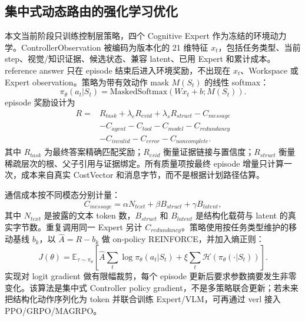 \documentclass[10pt,a4paper,twocolumn]{ctexart}
\begin{document}
\subsection{集中式动态路由的强化学习优化}
本文当前阶段只训练控制层策略，四个 Cognitive Expert 作为冻结的环境动力学。ControllerObservation 被编码为版本化的 21 维特征 $x_t$，包括任务类型、当前 step、视觉/知识证据、候选状态、兼容 latent、已用 Expert 和累计成本。reference answer 只在 episode 结束后进入环境奖励，不出现在 $x_t$、Workspace 或 Expert observation。策略为带有效动作 mask $M(S_t)$ 的线性 softmax：
\begin{equation}
\pi_\theta(a_t|S_t)=\mathrm{MaskedSoftmax}(Wx_t+b;M(S_t)).
\end{equation}
episode 奖励设计为
\begin{equation}
\begin{aligned}
R={}&R_{task}+\lambda_eR_{evid}+\lambda_sR_{struct}-C_{message}\\
&-C_{agent}-C_{tool}-C_{model}-C_{redundancy}\\
&-C_{invalid}-C_{error}-C_{noncomplete}.
\end{aligned}
\label{eq:reward}
\end{equation}
其中 $R_{task}$ 为最终答案精确匹配奖励；$R_{evid}$ 衡量证据链接与置信度；$R_{struct}$ 衡量稀疏层次的根、父子引用与证据绑定。所有质量项按最终 episode 增量只计算一次，成本来自真实 CostVector 和消息字节，而不是根据计划路径估算。

通信成本按不同模态分别计量：
\begin{equation}
C_{message}=\alpha N_{text}+\beta B_{struct}+\gamma B_{latent},
\end{equation}
其中 $N_{text}$ 是披露的文本 token 数，$B_{struct}$ 和 $B_{latent}$ 是结构化载荷与 latent 的真实字节数。重复调用同一 Expert 另计 $C_{redundancy}$。策略使用按任务类型维护的移动基线 $b_k$，以 $\hat A=R-b_k$ 做 on-policy REINFORCE，并加入熵正则：
\begin{equation}
J(\theta)=\mathbb E_{\tau\sim\pi_\theta}\left[
\hat A\sum_t\log\pi_\theta(a_t|S_t)+\xi\sum_t\mathcal H(\pi_\theta(\cdot|S_t))
\right].
\label{eq:routingpg}
\end{equation}
实现对 logit gradient 做有限幅裁剪，每个 episode 更新后要求参数摘要发生非零变化。该算法是集中式 Controller policy gradient，不是多策略联合更新；若未来把结构化动作序列化为 token 并联合训练 Expert/VLM，可再通过 verl 接入 PPO/GRPO/MAGRPO。
\end{document}
